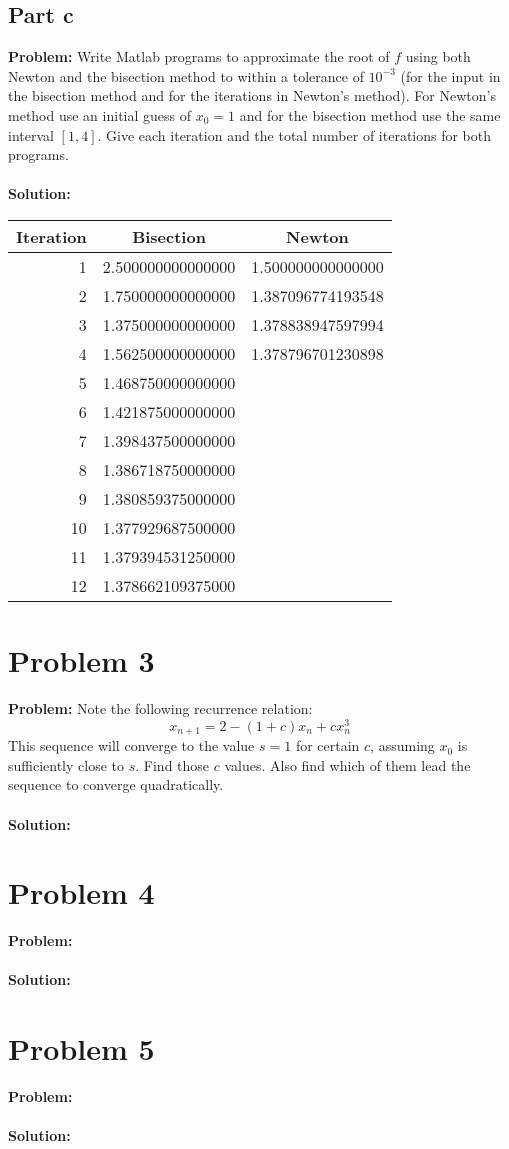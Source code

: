 \documentclass{article}
\begin{document}
\subsection*{Part c}
\textbf{Problem:} Write Matlab programs to approximate the root of $f$ using both Newton and the bisection method to within a tolerance of $10^{-3}$ (for the input in the bisection method and for the iterations in Newton's method). For Newton's method use an initial guess of $x_0=1$ and for the bisection method use the same interval $[1,4]$. Give each iteration and the total number of iterations for both programs.
\\\\
\textbf{Solution:}
\begin{center}
\begin{tabular}{r|c|c}
      Iteration & Bisection & Newton\\
      \hline
      1 & 2.500000000000000 & 1.500000000000000\\
      2 & 1.750000000000000 & 1.387096774193548\\
      3 & 1.375000000000000 & 1.378838947597994\\
      4 & 1.562500000000000 & 1.378796701230898\\
      5 & 1.468750000000000 & \\
      6 & 1.421875000000000 & \\
      7 & 1.398437500000000 & \\
      8 & 1.386718750000000 & \\
      9 & 1.380859375000000 & \\
      10 & 1.377929687500000 & \\
      11 & 1.379394531250000 & \\
      12 & 1.378662109375000 & \\
\end{tabular}
\end{center}

\section*{Problem 3}
\textbf{Problem:} Note the following recurrence relation:
$$x_{n+1}=2-(1+c)x_n+cx_n^3$$
This sequence will converge to the value $s=1$ for certain $c$, assuming $x_0$ is sufficiently close to $s$. Find those $c$ values. Also find which of them lead the sequence to converge quadratically.
\\\\
\textbf{Solution:}

\section*{Problem 4}
\textbf{Problem:}
\\\\
\textbf{Solution:}

\section*{Problem 5}
\textbf{Problem:}
\\\\
\textbf{Solution:}
\end{document}
